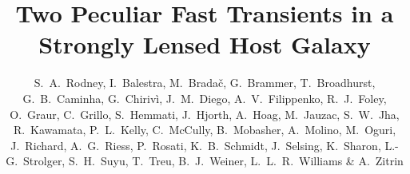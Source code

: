 \title{Two Peculiar Fast Transients in a Strongly Lensed Host Galaxy}


\author{
S.~A.~Rodney,
I.~Balestra,
M.~Brada\v{c},
G.~Brammer,
T.~Broadhurst,
G.~B.~Caminha,
G.~Chiriv{\`i},
J.~M.~Diego,
A.~V.~Filippenko,
R.~J.~Foley,
O.~Graur,
C.~Grillo,
S.~Hemmati,
J.~Hjorth,
A.~Hoag,
M.~Jauzac,
S.~W.~Jha,
R.~Kawamata,
P.~L.~Kelly,
C.~McCully,
B.~Mobasher,
A.~Molino,
M.~Oguri,
J.~Richard,
A.~G.~Riess,
P.~Rosati,
K.~B.~Schmidt,
J.~Selsing,
K.~Sharon,
L.-G.~Strolger,
S.~H.~Suyu,
T.~Treu,
B.~J.~Weiner,
L.~L.~R.~Williams \&
A.~Zitrin
}



